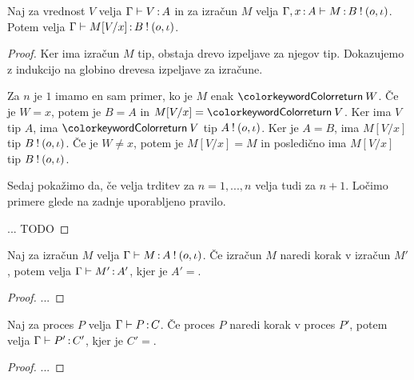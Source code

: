 \begin{lema}[o substituciji]
	Naj za vrednost $V$ velja $\Gamma \vdash V \mathinner{:} A$ in za izračun $M$ velja $\Gamma, x \mathinner{:} A \vdash M \mathinner{:} B \mathbin{!} (o, \iota)$. Potem velja $\Gamma \vdash M[V/x] \mathinner{:} B \mathbin{!} (o, \iota)$.
\end{lema}

\begin{proof}
	Ker ima izračun $M$ tip, obstaja drevo izpeljave za njegov tip.
	Dokazujemo z indukcijo na globino drevesa izpeljave za izračune.
	
	Za $n$ je $1$ imamo en sam primer, ko je $M$ enak $\tmreturn{W}$.
	Če je $W = x$, potem je $B = A$ in $M[V/x] = \tmreturn{V}$. Ker ima $V$ tip $A$, ima $\tmreturn{V}$ tip $A \mathbin{!} (o, \iota)$. Ker je $A = B$, ima $M[V/x]$ tip $B \mathbin{!} (o, \iota)$.
	Če je $W \neq x$, potem je $M[V/x] = M$ in posledično ima $M[V/x]$ tip $B \mathbin{!} (o, \iota)$.
	
	Sedaj pokažimo da, če velja trditev za $n = 1,...,n$ velja tudi za $n+1$.
	Ločimo primere glede na zadnje uporabljeno pravilo.
	
	... TODO
\end{proof}

\begin{trditev}[o ohranitvi]
	Naj za izračun $M$ velja $\Gamma \vdash M \mathinner{:} A \mathbin{!} (o, \iota)$. Če izračun $M$ naredi korak v izračun $M'$, potem velja $\Gamma \vdash M' \mathinner{:} A'$, kjer je $A' = $.
\end{trditev}

\begin{proof}
	...
\end{proof}

\begin{izrek}[o ohranitvi]
	Naj za proces $P$ velja $\Gamma \vdash P \mathinner{:} C$. Če proces $P$ naredi korak v proces $P'$, potem velja $\Gamma \vdash P' \mathinner{:} C'$, kjer je $C' = $.
\end{izrek}

\begin{proof}
	...
\end{proof}